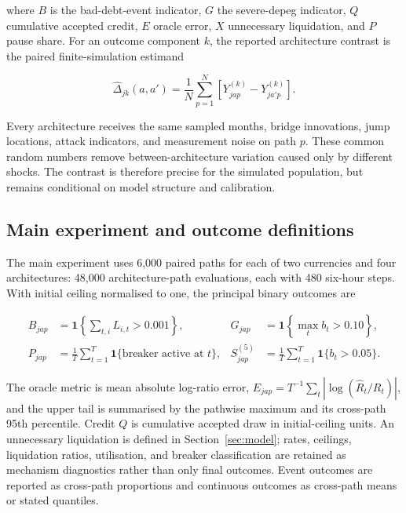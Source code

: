 \documentclass[sn-vancouver,Numbered]{sn-jnl}
\begin{document}
where $B$ is the bad-debt-event indicator, $G$ the severe-depeg indicator, $Q$ cumulative accepted credit, $E$ oracle error, $X$ unnecessary liquidation, and $P$ pause share. For an outcome component $k$, the reported architecture contrast is the paired finite-simulation estimand

\begin{equation}
 \widehat\Delta_{jk}(a,a')=
 \frac{1}{N}\sum_{p=1}^{N}
 \left[Y_{jap}^{(k)}-Y_{ja'p}^{(k)}\right].
 \label{eq:paired-estimand}
\end{equation}

Every architecture receives the same sampled months, bridge innovations, jump locations, attack indicators, and measurement noise on path $p$. These common random numbers remove between-architecture variation caused only by different shocks. The contrast is therefore precise for the simulated population, but remains conditional on model structure and calibration.

\subsection{Main experiment and outcome definitions}

The main experiment uses 6,000 paired paths for each of two currencies and four architectures: 48,000 architecture-path evaluations, each with 480 six-hour steps. With initial ceiling normalised to one, the principal binary outcomes are

\begin{align}
 B_{jap}&=\mathbf{1}\!\left\{\sum_{t,i}L_{i,t}>0.001\right\},
 &G_{jap}&=\mathbf{1}\!\left\{\max_t b_t>0.10\right\},\\
 P_{jap}&=\frac{1}{T}\sum_{t=1}^{T}\mathbf{1}\{\text{breaker active at }t\},
 &S_{jap}^{(5)}&=\frac{1}{T}\sum_{t=1}^{T}\mathbf{1}\{b_t>0.05\}.
 \label{eq:outcomes}
\end{align}

The oracle metric is mean absolute log-ratio error,
$E_{jap}=T^{-1}\sum_t|\log(\widehat R_t/R_t)|$, and the upper tail is summarised by the pathwise maximum and its cross-path 95th percentile. Credit $Q$ is cumulative accepted draw in initial-ceiling units. An unnecessary liquidation is defined in Section~\ref{sec:model}; rates, ceilings, liquidation ratios, utilisation, and breaker classification are retained as mechanism diagnostics rather than only final outcomes. Event outcomes are reported as cross-path proportions and continuous outcomes as cross-path means or stated quantiles.
\end{document}
